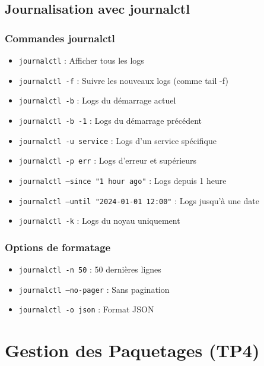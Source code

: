 \documentclass[12pt,a4paper]{article}
\begin{document}
\subsection{Journalisation avec journalctl}

\subsubsection{Commandes journalctl}
\begin{itemize}
    \item \texttt{journalctl} : Afficher tous les logs
    \item \texttt{journalctl -f} : Suivre les nouveaux logs (comme tail -f)
    \item \texttt{journalctl -b} : Logs du démarrage actuel
    \item \texttt{journalctl -b -1} : Logs du démarrage précédent
    \item \texttt{journalctl -u service} : Logs d'un service spécifique
    \item \texttt{journalctl -p err} : Logs d'erreur et supérieurs
    \item \texttt{journalctl --since "1 hour ago"} : Logs depuis 1 heure
    \item \texttt{journalctl --until "2024-01-01 12:00"} : Logs jusqu'à une date
    \item \texttt{journalctl -k} : Logs du noyau uniquement
\end{itemize}

\subsubsection{Options de formatage}
\begin{itemize}
    \item \texttt{journalctl -n 50} : 50 dernières lignes
    \item \texttt{journalctl --no-pager} : Sans pagination
    \item \texttt{journalctl -o json} : Format JSON
\end{itemize}


\section{Gestion des Paquetages (TP4)}
\end{document}

